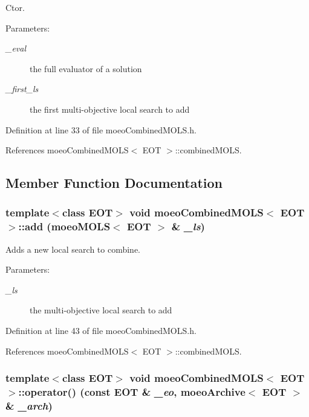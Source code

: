 Ctor. 

\begin{Desc}
\item[Parameters:]
\begin{description}
\item[{\em \_\-eval}]the full evaluator of a solution \item[{\em \_\-first\_\-ls}]the first multi-objective local search to add \end{description}
\end{Desc}


Definition at line 33 of file moeo\-Combined\-MOLS.h.

References moeo\-Combined\-MOLS$<$ EOT $>$::combined\-MOLS.

\subsection{Member Function Documentation}
\subsubsection{\setlength{\rightskip}{0pt plus 5cm}template$<$class EOT$>$ void {\bf moeo\-Combined\-MOLS}$<$ EOT $>$::add ({\bf moeo\-MOLS}$<$ EOT $>$ \& {\em \_\-ls})\hspace{0.3cm}{\tt  [inline]}}\label{classmoeoCombinedMOLS_bd6b8f46211d5d531753c69fcd76cba4}


Adds a new local search to combine. 

\begin{Desc}
\item[Parameters:]
\begin{description}
\item[{\em \_\-ls}]the multi-objective local search to add \end{description}
\end{Desc}


Definition at line 43 of file moeo\-Combined\-MOLS.h.

References moeo\-Combined\-MOLS$<$ EOT $>$::combined\-MOLS.
\subsubsection{\setlength{\rightskip}{0pt plus 5cm}template$<$class EOT$>$ void {\bf moeo\-Combined\-MOLS}$<$ EOT $>$::operator() (const EOT \& {\em \_\-eo}, {\bf moeo\-Archive}$<$ EOT $>$ \& {\em \_\-arch})\hspace{0.3cm}{\tt  [inline, virtual]}}\label{classmoeoCombinedMOLS_fa7de12db00b89feb139372603bba4aa}


